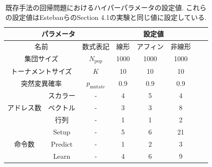 \documentclass[11pt,oneside,openany,report]{jsbook}
\begin{document}
\begin{table}[tbp]
  \caption{既存手法の回帰問題におけるハイパーパラメータの設定値. これらの設定値はEstebanらのSection 4.1の実験と同じ値に設定している\cite{automl_zero}.}
  \label{table:exp
  :setting:conventional}
  \centering
  \begin{tabular}{|c|c|c|c|c|c|c|c|}
    \hline
    \multicolumn{3}{|c|}{パラメータ} & \multicolumn{3}{c|}{設定値} \\
    \hline
    \multicolumn{2}{|c|}{名前} & 数式表記 & 線形 & アフィン & 非線形 \\
    \hline
    \hline
    \multicolumn{2}{|c|}{集団サイズ} & $N_\mathrm{pop}$ & 1000 & 1000 & 1000 \\
    \hline
    \multicolumn{2}{|c|}{トーナメントサイズ} & $K$ & 10 & 10 & 10 \\
    \hline
    \multicolumn{2}{|c|}{突然変異確率} & $p_\mathrm{mutate}$ & 0.9 & 0.9 & 0.9 \\
    \hline
    \multirow{3}{*}{アドレス数}
    & スカラー & - & 4 & 5 & 4 \\
    & ベクトル & - & 3 & 3 & 8 \\
    & 行列 & - & 1 & 1 & 2 \\
    \hline
    \multirow{3}{*}{命令数}
    & Setup      & - & 5 & 6 & 21 \\
    & Predict    & - & 1 & 2 & 3 \\
    & Learn      & - & 4 & 6 & 9 \\
    \hline
  \end{tabular}
\end{table}
\end{document}
